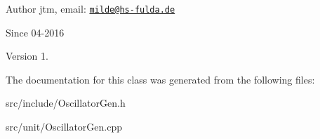 \begin{DoxyAuthor}{Author}
jtm, email\-:  \href{mailto:milde@hs-fulda.de}{\tt milde@hs-\/fulda.\-de} 
\end{DoxyAuthor}
\begin{DoxySince}{Since}
04-\/2016 
\end{DoxySince}
\begin{DoxyVersion}{Version}
1. 
\end{DoxyVersion}


The documentation for this class was generated from the following files\-:\begin{DoxyCompactItemize}
\item 
src/include/Oscillator\-Gen.\-h\item 
src/unit/Oscillator\-Gen.\-cpp\end{DoxyCompactItemize}
